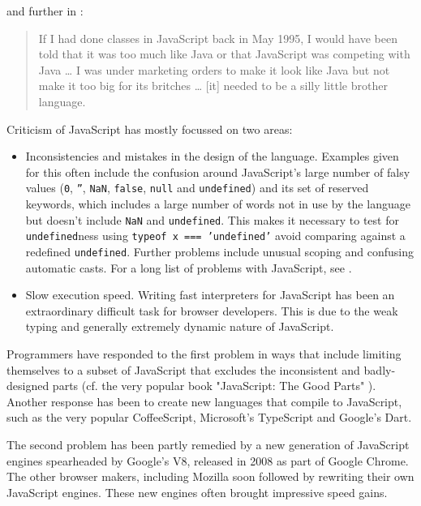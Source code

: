 \documentclass[11pt]{report}
\begin{document}
and further in \cite{comparticle}:

\begin{quote}
If I had done classes in JavaScript back in May 1995, I would have been told that it was too much like Java or that JavaScript was competing with Java … I was under marketing orders to make it look like Java but not make it too big for its britches … [it] needed to be a silly little brother language.
\end{quote}


Criticism of JavaScript has mostly focussed on two areas:
\begin{itemize}
\item Inconsistencies and mistakes in the design of the language. Examples given for this often include the confusion around JavaScript's large number of falsy values (\texttt{0},  \texttt{''}, \texttt{NaN}, \texttt{false}, \texttt{null} and \texttt{undefined}) and its set of reserved keywords, which includes a large number of words not in use by the language but doesn't include \texttt{NaN} and \texttt{undefined}. This makes it necessary to test for \texttt{undefined}ness using \mbox{\texttt{typeof x === 'undefined'}} avoid comparing against a redefined \texttt{undefined}. Further problems include unusual scoping and confusing automatic casts. For a long list of problems with JavaScript, see \cite{jsgoodparts}.
\item Slow execution speed. Writing fast interpreters for JavaScript has been an extraordinary difficult task for browser developers. This is due to the weak typing and generally extremely dynamic nature of JavaScript.
\end{itemize}


Programmers have responded to the first problem in ways that include limiting themselves to a subset of JavaScript that excludes the inconsistent and badly-designed parts (cf. the very popular book "JavaScript: The Good Parts" \cite{jsgoodparts}). Another response has been to create new languages that compile to JavaScript, such as the very popular CoffeeScript, Microsoft's TypeScript and Google's Dart.

The second problem has been partly remedied by a new generation of JavaScript engines spearheaded by Google's V8, released in 2008 as part of Google Chrome. The other browser makers, including Mozilla soon followed by rewriting their own JavaScript engines. These new engines often brought impressive speed gains.
\end{document}
